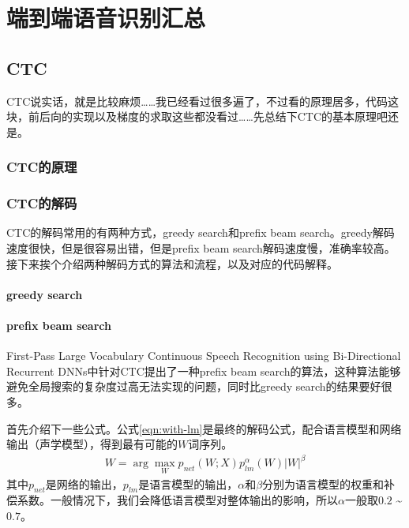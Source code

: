 \chapter{端到端语音识别汇总}
\section{CTC}
CTC说实话，就是比较麻烦……我已经看过很多遍了，不过看的原理居多，代码这块，前后向的实现以及梯度的求取这些都没看过……先总结下CTC的基本原理吧还是。

\subsection{CTC的原理}

\subsection{CTC的解码}
CTC的解码常用的有两种方式，greedy search和prefix beam search。greedy解码速度很快，但是很容易出错，但是prefix beam search解码速度慢，准确率较高。接下来挨个介绍两种解码方式的算法和流程，以及对应的代码解释。

\subsubsection{greedy search}


\subsubsection{prefix beam search}
First-Pass Large Vocabulary Continuous Speech Recognition using Bi-Directional Recurrent DNNs中针对CTC提出了一种prefix beam search的算法，这种算法能够避免全局搜索的复杂度过高无法实现的问题，同时比greedy search的结果要好很多。

首先介绍下一些公式。公式\ref{eqn:with-lm}是最终的解码公式，配合语言模型和网络输出（声学模型），得到最有可能的$W$词序列。
\begin{align}
\label{eqn:with-lm}
W = \arg\mathop{\max}_{W}p_{net}(W;X)p_{lm}^{\alpha}(W)|W|^{\beta}
\end{align}
其中$p_{net}$是网络的输出，$p_{lm}$是语言模型的输出，$\alpha$和$\beta$分别为语言模型的权重和补偿系数。一般情况下，我们会降低语言模型对整体输出的影响，所以$\alpha$一般取$0.2$ \~ $0.7$。


